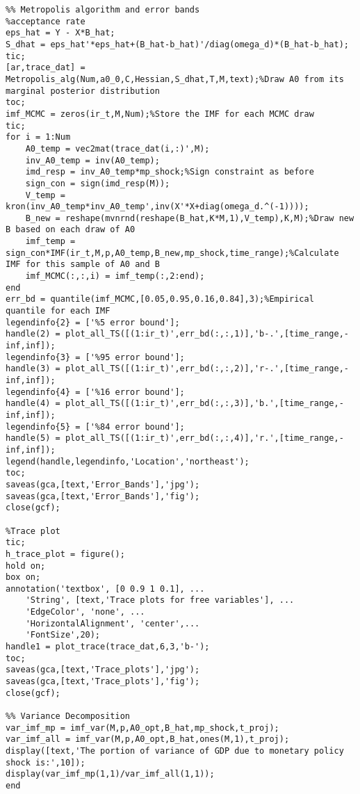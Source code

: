 \documentclass[11pt, oneside]{article}   	%
\begin{document}
\begin{appendices}
\begin{lstlisting}
%% Metropolis algorithm and error bands
%acceptance rate
eps_hat = Y - X*B_hat;
S_dhat = eps_hat'*eps_hat+(B_hat-b_hat)'/diag(omega_d)*(B_hat-b_hat);
tic;
[ar,trace_dat] = Metropolis_alg(Num,a0_0,C,Hessian,S_dhat,T,M,text);%Draw A0 from its marginal posterior distribution
toc;
imf_MCMC = zeros(ir_t,M,Num);%Store the IMF for each MCMC draw 
tic;
for i = 1:Num
    A0_temp = vec2mat(trace_dat(i,:)',M);
    inv_A0_temp = inv(A0_temp);
    imd_resp = inv_A0_temp*mp_shock;%Sign constraint as before
    sign_con = sign(imd_resp(M));
    V_temp = kron(inv_A0_temp*inv_A0_temp',inv(X'*X+diag(omega_d.^(-1))));
    B_new = reshape(mvnrnd(reshape(B_hat,K*M,1),V_temp),K,M);%Draw new B based on each draw of A0
    imf_temp = sign_con*IMF(ir_t,M,p,A0_temp,B_new,mp_shock,time_range);%Calculate IMF for this sample of A0 and B
    imf_MCMC(:,:,i) = imf_temp(:,2:end);
end
err_bd = quantile(imf_MCMC,[0.05,0.95,0.16,0.84],3);%Empirical quantile for each IMF
legendinfo{2} = ['%5 error bound'];
handle(2) = plot_all_TS([(1:ir_t)',err_bd(:,:,1)],'b-.',[time_range,-inf,inf]);
legendinfo{3} = ['%95 error bound'];
handle(3) = plot_all_TS([(1:ir_t)',err_bd(:,:,2)],'r-.',[time_range,-inf,inf]);
legendinfo{4} = ['%16 error bound'];
handle(4) = plot_all_TS([(1:ir_t)',err_bd(:,:,3)],'b.',[time_range,-inf,inf]);
legendinfo{5} = ['%84 error bound'];
handle(5) = plot_all_TS([(1:ir_t)',err_bd(:,:,4)],'r.',[time_range,-inf,inf]);
legend(handle,legendinfo,'Location','northeast');
toc;
saveas(gca,[text,'Error_Bands'],'jpg');
saveas(gca,[text,'Error_Bands'],'fig');
close(gcf);

%Trace plot
tic;
h_trace_plot = figure();
hold on;
box on;
annotation('textbox', [0 0.9 1 0.1], ...
    'String', [text,'Trace plots for free variables'], ...
    'EdgeColor', 'none', ...
    'HorizontalAlignment', 'center',...
    'FontSize',20);
handle1 = plot_trace(trace_dat,6,3,'b-');
toc;
saveas(gca,[text,'Trace_plots'],'jpg');
saveas(gca,[text,'Trace_plots'],'fig');
close(gcf);

%% Variance Decomposition
var_imf_mp = imf_var(M,p,A0_opt,B_hat,mp_shock,t_proj);
var_imf_all = imf_var(M,p,A0_opt,B_hat,ones(M,1),t_proj);
display([text,'The portion of variance of GDP due to monetary policy shock is:',10]);
display(var_imf_mp(1,1)/var_imf_all(1,1));
end
\end{lstlisting}


\end{appendices}
\end{document}
